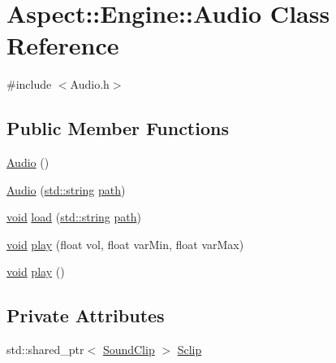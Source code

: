 \hypertarget{class_aspect_1_1_engine_1_1_audio}{}\section{Aspect\+:\+:Engine\+:\+:Audio Class Reference}
\label{class_aspect_1_1_engine_1_1_audio}


{\ttfamily \#include $<$Audio.\+h$>$}

\subsection*{Public Member Functions}
\begin{DoxyCompactItemize}
\item 
\mbox{\hyperlink{class_aspect_1_1_engine_1_1_audio_a83b2274ead49a03b7099f7c3f6e094d7}{Audio}} ()
\item 
\mbox{\hyperlink{class_aspect_1_1_engine_1_1_audio_a10c5fe7f0a1bed3ae07eb4eb695fe82b}{Audio}} (\mbox{\hyperlink{_s_d_l__opengl__glext_8h_ae84541b4f3d8e1ea24ec0f466a8c568b}{std\+::string}} \mbox{\hyperlink{_s_d_l__opengl__glext_8h_ab25d8cd967ccbd19b630d7100ff8f67e}{path}})
\item 
\mbox{\hyperlink{_s_d_l__opengles2__gl2ext_8h_ae5d8fa23ad07c48bb609509eae494c95}{void}} \mbox{\hyperlink{class_aspect_1_1_engine_1_1_audio_a4371798b0db2bf368dc2526731474798}{load}} (\mbox{\hyperlink{_s_d_l__opengl__glext_8h_ae84541b4f3d8e1ea24ec0f466a8c568b}{std\+::string}} \mbox{\hyperlink{_s_d_l__opengl__glext_8h_ab25d8cd967ccbd19b630d7100ff8f67e}{path}})
\item 
\mbox{\hyperlink{_s_d_l__opengles2__gl2ext_8h_ae5d8fa23ad07c48bb609509eae494c95}{void}} \mbox{\hyperlink{class_aspect_1_1_engine_1_1_audio_ae0263b513749d07eee8e5596006aba04}{play}} (float vol, float var\+Min, float var\+Max)
\item 
\mbox{\hyperlink{_s_d_l__opengles2__gl2ext_8h_ae5d8fa23ad07c48bb609509eae494c95}{void}} \mbox{\hyperlink{class_aspect_1_1_engine_1_1_audio_aa5902d97e785ed834b24f2b4fa8abde6}{play}} ()
\end{DoxyCompactItemize}
\subsection*{Private Attributes}
\begin{DoxyCompactItemize}
\item 
std\+::shared\+\_\+ptr$<$ \mbox{\hyperlink{struct_aspect_1_1_engine_1_1_sound_clip}{Sound\+Clip}} $>$ \mbox{\hyperlink{class_aspect_1_1_engine_1_1_audio_a883c5943b7fc9be22459e050ba8c7624}{Sclip}}
\end{DoxyCompactItemize}


